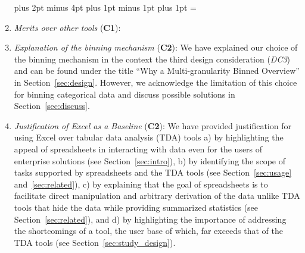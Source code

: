 \begin{enumerate}
\leftmargin=25pt \rightmargin=0pt   \itemindent=0pt \listparindent=0pt \topsep=0pt plus 2pt minus 4pt \partopsep=0pt plus 1pt minus 1pt \parsep=0pt plus 1pt \itemsep=\parsep

\item \textit{Merits over other tools} (\textbf{C1}):  

\item \textit{Explanation of the binning mechanism} (\textbf{C2}): We have explained our choice of the binning mechanism in the context the third design consideration (\emph{DC3}) and can be found under the title ``Why a Multi-granularity Binned Overview'' in Section~\ref{sec:design}.  However, we acknowledge the limitation of this choice for binning categorical data and discuss possible solutions in Section~\ref{sec:discuss}. 

\item \textit{Justification of Excel as a Baseline} (\textbf{C2}):
We have provided justification for using Excel over tabular data analysis (TDA) tools a) by highlighting the appeal of spreadsheets in interacting with data even for the users of enterprise solutions (see Section~\ref{sec:intro}), b) by identifying the scope of tasks supported by spreadsheets and the TDA tools (see Section~\ref{sec:usage} and~\ref{sec:related}), c) by explaining that the goal of spreadsheets is to facilitate direct manipulation and arbitrary derivation of the data unlike TDA tools that hide the data while providing summarized statistics (see Section~\ref{sec:related}), and d) by highlighting the importance of addressing the shortcomings of a tool, the user base of which, far exceeds that of the TDA tools (see Section~\ref{sec:study_design}). 


\end{enumerate}
